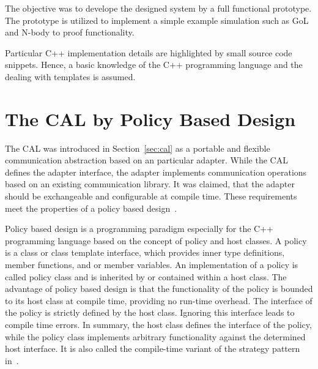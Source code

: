 The objective was to develope the designed system by a full functional prototype.
The prototype is utilized to implement a simple example simulation such as GoL
and N-body to proof functionality. 

Particular C++ implementation details are highlighted by small source
code snippets. Hence, a basic knowledge of the C++ programming
language and the dealing with templates is assumed.

\section{The CAL by Policy Based Design}

The CAL was introduced in
Section~\ref{sec:cal} as a portable and flexible communication
abstraction based on an particular adapter. While the CAL defines the
adapter interface, the adapter implements communication operations
based on an existing communication library.  It was claimed, that the
adapter should be exchangeable and configurable at compile time. These
requirements meet the properties of a policy based
design~\cite{ref:policy_based_design}.


Policy based design is a programming paradigm especially for the C++
programming language based on the concept of policy and host classes.
A policy is a class or class template interface, which provides inner
type definitions, member functions, and or member variables. An
implementation of a policy is called policy class and is inherited by
or contained within a host class.  The advantage of policy based
design is that the functionality of the policy is bounded to its host
class at compile time, providing no run-time overhead.  The interface
of the policy is strictly defined by the host class. Ignoring this
interface leads to compile time errors. In summary, the host class
defines the interface of the policy, while the policy class implements
arbitrary functionality against the determined host interface. It is
also called the compile-time variant of the strategy pattern
in~\cite{ref:policy_strategy}.

